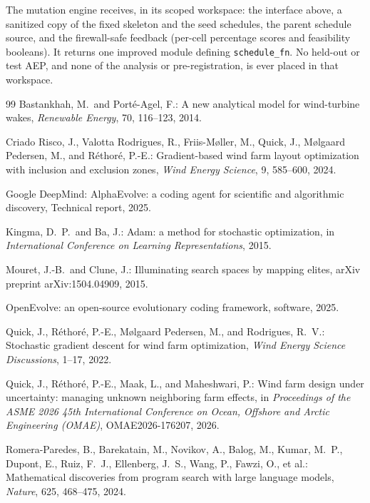 \documentclass[11pt]{article}
\begin{document}
\noindent The mutation engine receives, in its scoped workspace: the interface above,
a sanitized copy of the fixed skeleton and the seed schedules, the parent schedule
source, and the firewall-safe feedback (per-cell percentage scores and feasibility
booleans). It returns one improved module defining \texttt{schedule\_fn}. No held-out
or test AEP, and none of the analysis or pre-registration, is ever placed in that
workspace.

\begin{thebibliography}{99}
\small
{}
Bastankhah, M.\ and Port\'e-Agel, F.: A new analytical model for wind-turbine wakes,
\textit{Renewable Energy}, 70, 116--123, 2014.

Criado Risco, J., Valotta Rodrigues, R., Friis-M{\o}ller, M., Quick, J.,
M{\o}lgaard Pedersen, M., and R\'ethor\'e, P.-E.: Gradient-based wind farm layout
optimization with inclusion and exclusion zones, \textit{Wind Energy Science}, 9,
585--600, 2024.

Google DeepMind: AlphaEvolve: a coding agent for scientific and algorithmic discovery,
Technical report, 2025.

Kingma, D.\ P.\ and Ba, J.: Adam: a method for stochastic optimization, in
\textit{International Conference on Learning Representations}, 2015.

Mouret, J.-B.\ and Clune, J.: Illuminating search spaces by mapping elites, arXiv
preprint arXiv:1504.04909, 2015.

OpenEvolve: an open-source evolutionary coding framework, software, 2025.

Quick, J., R\'ethor\'e, P.-E., M{\o}lgaard Pedersen, M., and Rodrigues, R.\ V.:
Stochastic gradient descent for wind farm optimization, \textit{Wind Energy Science
Discussions}, 1--17, 2022.

Quick, J., R\'ethor\'e, P.-E., Maak, L., and Maheshwari, P.: Wind farm design under
uncertainty: managing unknown neighboring farm effects, in \textit{Proceedings of the
ASME 2026 45th International Conference on Ocean, Offshore and Arctic Engineering
(OMAE)}, OMAE2026-176207, 2026.

Romera-Paredes, B., Barekatain, M., Novikov, A., Balog, M., Kumar, M.\ P., Dupont, E.,
Ruiz, F.\ J., Ellenberg, J.\ S., Wang, P., Fawzi, O., et al.: Mathematical discoveries
from program search with large language models, \textit{Nature}, 625, 468--475, 2024.


\end{thebibliography}
\end{document}
